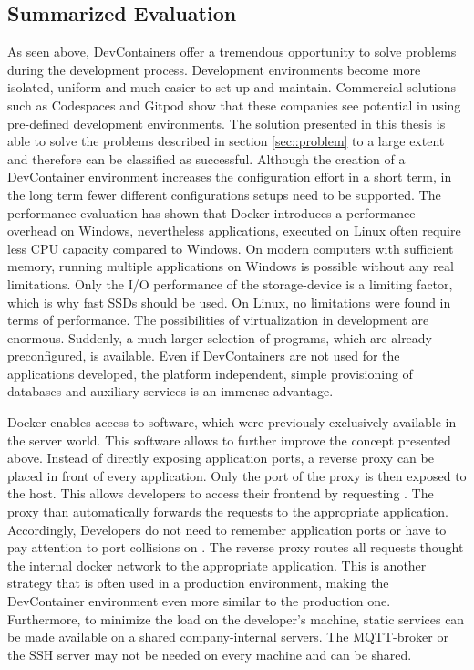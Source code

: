     \subsection{Summarized Evaluation}
    As seen above, DevContainers offer a tremendous opportunity to solve problems during the development process. Development environments become more isolated, uniform and much easier to set up and maintain. Commercial solutions such as Codespaces and Gitpod show that these companies see potential in using pre-defined development environments.\newline
    The solution presented in this thesis is able to solve the problems described in section \ref{sec::problem} to a large extent and therefore can be classified as successful. Although the creation of a DevContainer environment increases the configuration effort in a short term, in the long term fewer different configurations setups need to be supported. The performance evaluation has shown that Docker introduces a performance overhead on Windows, nevertheless applications, executed on Linux often require less CPU capacity compared to Windows. On modern computers with sufficient memory, running multiple applications on Windows is possible without any real limitations. Only the I/O performance of the storage-device is a limiting factor, which is why fast SSDs should be used. On Linux, no limitations were found in terms of performance. \newline
    The possibilities of virtualization in development are enormous. Suddenly, a much larger selection of programs, which are already preconfigured, is available. Even if DevContainers are not used for the applications developed, the platform independent, simple provisioning of databases and auxiliary services is an immense advantage.

    Docker enables access to software, which were previously exclusively available in the server world. This software allows to further improve the concept presented above. Instead of directly exposing application ports, a reverse proxy can be placed in front of every application. Only the port of the proxy is then exposed to the host. This allows developers to access their frontend by requesting . The proxy than automatically forwards the requests to the appropriate application. Accordingly, Developers do not need to remember application ports or have to pay attention to port collisions on . The reverse proxy routes all requests thought the internal docker network to the appropriate application. This is another strategy that is often used in a production environment, making the DevContainer environment even more similar to the production one. Furthermore, to minimize the load on the developer's machine, static services can be made available on a shared company-internal servers. The MQTT-broker or the \ac{SSH} server may not be needed on every machine and can be shared.

